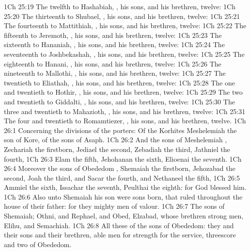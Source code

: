 \vs 1Ch 25:19 The twelfth to Hashabiah, , his sons, and his brethren,  twelve:
\vs 1Ch 25:20 The thirteenth to Shubael, , his sons, and his brethren,  twelve:
\vs 1Ch 25:21 The fourteenth to Mattithiah, , his sons, and his brethren,  twelve:
\vs 1Ch 25:22 The fifteenth to Jeremoth, , his sons, and his brethren,  twelve:
\vs 1Ch 25:23 The sixteenth to Hananiah, , his sons, and his brethren,  twelve:
\vs 1Ch 25:24 The seventeenth to Joshbekashah, , his sons, and his brethren,  twelve:
\vs 1Ch 25:25 The eighteenth to Hanani, , his sons, and his brethren,  twelve:
\vs 1Ch 25:26 The nineteenth to Mallothi, , his sons, and his brethren,  twelve:
\vs 1Ch 25:27 The twentieth to Eliathah, , his sons, and his brethren,  twelve:
\vs 1Ch 25:28 The one and twentieth to Hothir, , his sons, and his brethren,  twelve:
\vs 1Ch 25:29 The two and twentieth to Giddalti, , his sons, and his brethren,  twelve:
\vs 1Ch 25:30 The three and twentieth to Mahazioth, , his sons, and his brethren,  twelve:
\vs 1Ch 25:31 The four and twentieth to Romamtiezer, , his sons, and his brethren,  twelve.
\vs 1Ch 26:1 Concerning the divisions of the porters: Of the Korhites  Meshelemiah the son of Kore, of the sons of Asaph.
\vs 1Ch 26:2 And the sons of Meshelemiah , Zechariah the firstborn, Jediael the second, Zebadiah the third, Jathniel the fourth,
\vs 1Ch 26:3 Elam the fifth, Jehohanan the sixth, Elioenai the seventh.
\vs 1Ch 26:4 Moreover the sons of Obededom , Shemaiah the firstborn, Jehozabad the second, Joah the third, and Sacar the fourth, and Nethaneel the fifth,
\vs 1Ch 26:5 Ammiel the sixth, Issachar the seventh, Peulthai the eighth: for God blessed him.
\vs 1Ch 26:6 Also unto Shemaiah his son were sons born, that ruled throughout the house of their father: for they  mighty men of valour.
\vs 1Ch 26:7 The sons of Shemaiah; Othni, and Rephael, and Obed, Elzabad, whose brethren  strong men, Elihu, and Semachiah.
\vs 1Ch 26:8 All these of the sons of Obededom: they and their sons and their brethren, able men for strength for the service,  threescore and two of Obededom.
